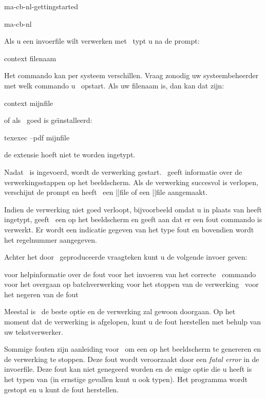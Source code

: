 \startonderdeel ma-cb-nl-gettingstarted

\produkt ma-cb-nl



Als u een invoerfile wilt verwerken met \CONTEXT\ typt u na
de prompt:

\starttypen
context filenaam
\stoptypen

Het commando  kan per systeem verschillen. Vraag
zonodig uw systeembeheerder met welk commando u \CONTEXT\
opstart. Als uw filenaam  is, dan kan dat
zijn:

\starttypen
context mijnfile
\stoptypen

of als \TEXEXEC\ goed is ge\"{\i}nstalleerd:

\starttypen
texexec --pdf mijnfile
\stoptypen


de extensie  hoeft niet te worden ingetypt.

Nadat \Enter\ is ingevoerd, wordt de verwerking gestart.
\CONTEXT\ geeft informatie over de verwerkingsstappen op het
beeldscherm. Als de verwerking succesvol is verlopen,
verschijnt de prompt en heeft \CONTEXT\ een
||file of een \PDF||file aangemaakt.

Indien de verwerking niet goed verloopt, bijvoorbeeld omdat
u \type{\stptekst} in plaats van \type{\stoptekst} heeft
ingetypt, geeft \CONTEXT\ een   op het beeldscherm
en geeft aan dat er een fout commando is verwerkt. Er wordt
een indicatie gegeven van het type fout en bovendien wordt
het regelnummer aangegeven.

Achter het door \CONTEXT\ geproduceerde vraagteken kunt u de
volgende invoer geven:

\starttabulatie[|||]
\NC {} \NC voor helpinformatie over de fout \NC\NR
\NC {} \NC voor het invoeren van het correcte \CONTEXT\ commando \NC\NR
\NC \type{Q} \NC voor het overgaan op batchverwerking \NC\NR
\NC {} \NC voor het stoppen van de verwerking \NC\NR
\NC \Enter\  \NC voor het negeren van de fout \NC\NR
\stoptabulatie

Meestal is \Enter\ de beste optie en de verwerking zal gewoon
doorgaan. Op het moment dat de verwerking is afgelopen, kunt u
de fout herstellen met behulp van uw tekstverwerker.

Sommige fouten zijn aanleiding voor \CONTEXT\ om een
\type{ * } op het beeldscherm te genereren en de verwerking te
stoppen. Deze fout wordt veroorzaakt door een {\em fatal
error} in de invoerfile. Deze fout kan niet genegeerd worden
en de enige optie die u heeft is het typen van \type{\stop}
(in ernstige gevallen kunt u ook  typen). Het
programma wordt gestopt en u kunt de fout herstellen.

